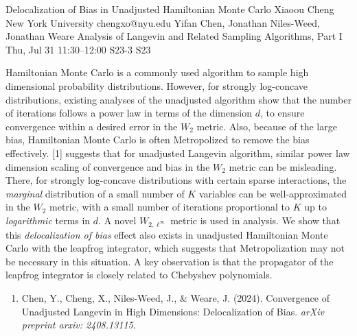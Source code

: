\begin{talk}
  {Delocalization of Bias in Unadjusted Hamiltonian Monte Carlo}%
  {Xiaoou Cheng}%
  {New York University}%
  {chengxo@nyu.edu}%
  {Yifan Chen, Jonathan Niles-Weed, Jonathan Weare}%
  {Analysis of Langevin and Related Sampling Algorithms, Part I}%
  {Thu, Jul 31 11:30--12:00}%
  {S23-3}%
  {S23}%
    
   
Hamiltonian Monte Carlo is a commonly used algorithm to sample high dimensional probability distributions. However, for strongly log-concave distributions, existing analyses of the unadjusted algorithm show that the number of iterations follows a power law in terms of the dimension $d$, to ensure convergence within a desired error in the $W_2$ metric. Also, because of the large bias, Hamiltonian Monte Carlo is often Metropolized to remove the bias effectively. [1] suggests that for unadjusted Langevin algorithm, similar power law dimension scaling of convergence and bias in the $W_2$ metric can be misleading. There, for strongly log-concave distributions with certain sparse interactions, the \emph{marginal} distribution of a small number of $K$ variables can be well-approximated in the $W_2$ metric, with a small number of iterations proportional to $K$ up to \emph{logarithmic} terms in $d$. A novel $W_{2,\ell^\infty}$ metric is used in analysis. We show that this \emph{delocalization of bias} effect also exists in unadjusted Hamiltonian Monte Carlo with the leapfrog integrator, which suggests that Metropolization may not be necessary in this situation. A key observation is that the propagator of the leapfrog integrator is closely related to Chebyshev polynomials.

\medskip

\begin{enumerate}
 \item[{[1]}] Chen, Y., Cheng, X., Niles-Weed, J., \& Weare, J. (2024). Convergence of Unadjusted Langevin in High Dimensions: Delocalization of Bias. \textit{arXiv preprint arxiv: 2408.13115}.
\end{enumerate}

\end{talk}

